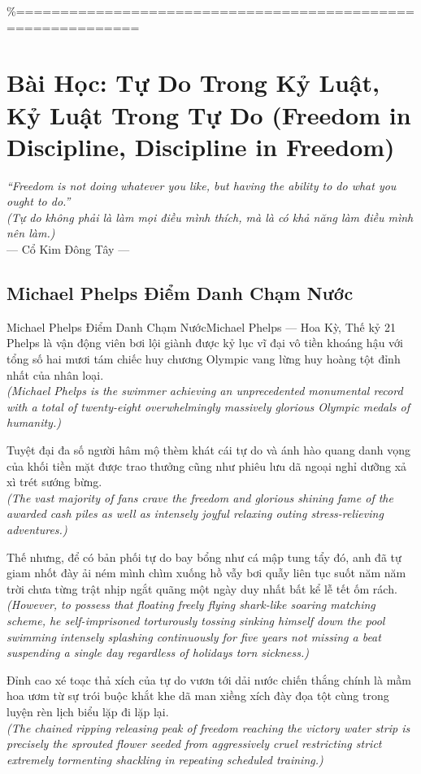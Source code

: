 \%============================================================
\chapter{Bài Học: Tự Do Trong Kỷ Luật, Kỷ Luật Trong Tự Do (Freedom in Discipline, Discipline in Freedom)}
\begin{center}
  \textit{\color{truyengold}``Freedom is not doing whatever you like, but having the ability to do what you ought to do.''}\\[4pt]
  \textit{(Tự do không phải là làm mọi điều mình thích, mà là có khả năng làm điều mình nên làm.)}\\[4pt]
  \small\color{truyenblue}--- Cổ Kim Đông Tây ---
\end{center}
\ngancach

\section{Michael Phelps Điểm Danh Chạm Nước}
\begin{truyen}{Michael Phelps Điểm Danh Chạm Nước}{Michael Phelps --- Hoa Kỳ, Thế kỷ 21}
 Phelps là vận động viên bơi lội giành được kỷ lục vĩ đại vô tiền khoáng hậu với tổng số hai mươi tám chiếc huy chương Olympic vang lừng huy hoàng tột đỉnh nhất của nhân loại.\\[4pt]
\textit{(Michael Phelps is the swimmer achieving an unprecedented monumental record with a total of twenty-eight overwhelmingly massively glorious Olympic medals of humanity.)}

Tuyệt đại đa số người hâm mộ thèm khát cái tự do và ánh hào quang danh vọng của khối tiền mặt được trao thưởng cũng như phiêu lưu dã ngoại nghỉ dưỡng xả xì trét sướng bừng.\\[4pt]
\textit{(The vast majority of fans crave the freedom and glorious shining fame of the awarded cash piles as well as intensely joyful relaxing outing stress-relieving adventures.)}

Thế nhưng, để có bản phối tự do bay bổng như cá mập tung tẩy đó, anh đã tự giam nhốt đày ải ném mình chìm xuống hồ vẫy bơi quẫy liên tục suốt năm năm trời chưa từng trật nhịp ngắt quãng một ngày duy nhất bất kể lễ tết ốm rách.\\[4pt]
\textit{(However, to possess that floating freely flying shark-like soaring matching scheme, he self-imprisoned torturously tossing sinking himself down the pool swimming intensely splashing continuously for five years not missing a beat suspending a single day regardless of holidays torn sickness.)}

Đỉnh cao xé toạc thả xích của tự do vươn tới dải nước chiến thắng chính là mầm hoa ươm từ sự trói buộc khắt khe dã man xiềng xích đày đọa tột cùng trong luyện rèn lịch biểu lặp đi lặp lại.\\[4pt]
\textit{(The chained ripping releasing peak of freedom reaching the victory water strip is precisely the sprouted flower seeded from aggressively cruel restricting strict extremely tormenting shackling in repeating scheduled training.)}

\end{truyen}
